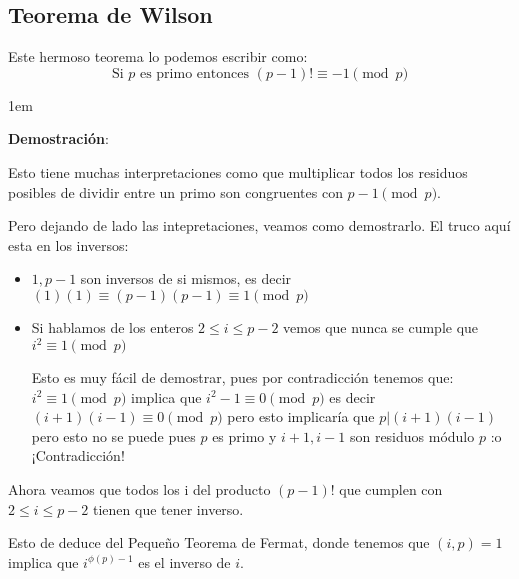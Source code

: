 \documentclass[12pt, fleqn]{report}                             %
\newenvironment{SmallIndentation}[1][0.75em]                    %
    {\begin{adjustwidth}{#1}{}\begin{footnotesize}}                 %
    {\end{footnotesize}\end{adjustwidth}}                           %
\begin{document}
        \subsection{Teorema de Wilson}

            Este hermoso teorema lo podemos escribir como:
            \begin{equation}
                \text{Si $p$ es primo entonces } (p-1)! \equiv -1 \pmod{p}
            \end{equation}


            \begin{SmallIndentation}[1em]
                \textbf{Demostración}:

                Esto tiene muchas interpretaciones como que multiplicar todos los residuos
                posibles de dividir entre un primo son congruentes con $p-1 \pmod{p}$.

                Pero dejando de lado las intepretaciones, veamos como demostrarlo.
                El truco aquí esta en los inversos:

                \begin{itemize}
                    \item $1, p-1$ son inversos de si mismos, es decir
                        $(1)(1) \equiv (p-1)(p-1) \equiv 1 \pmod{p}$

                    \item Si hablamos de los enteros $2 \leq i \leq p-2$ vemos que 
                        nunca se cumple que $i^2 \equiv 1 \pmod{p}$

                        Esto es muy fácil de demostrar, pues por contradicción tenemos
                        que: $i^2 \equiv 1 \pmod{p}$ implica que $i^2 - 1\equiv 0 \pmod{p}$
                        es decir $(i+1)(i-1) \equiv 0 \pmod{p}$ pero esto implicaría que
                        $p | (i+1)(i-1)$ pero esto no se puede pues $p$ es primo y 
                        $i+1, i-1$ son residuos módulo $p$ :o ¡Contradicción!

                \end{itemize}


                Ahora veamos que todos los i del producto $(p-1)!$ que cumplen
                con $2 \leq i \leq p-2$ tienen que tener inverso.

                Esto de deduce del Pequeño Teorema de Fermat, donde tenemos
                que $(i, p) = 1$ implica que $i^{\phi(p)-1}$ es el inverso de $i$.


\end{SmallIndentation}
\end{document}
